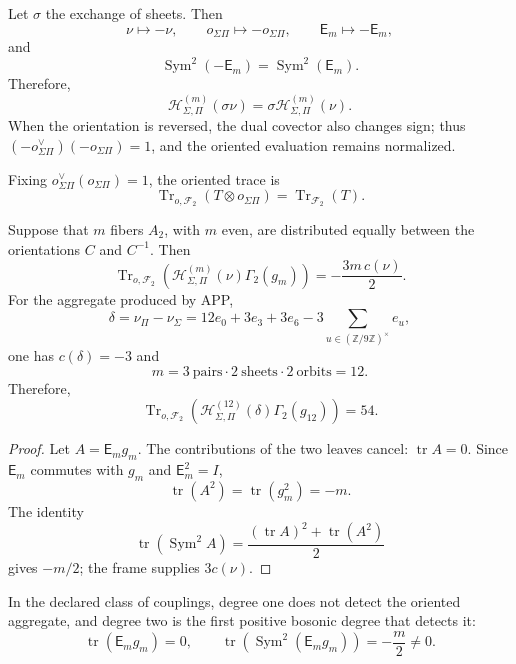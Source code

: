 Let \(\sigma\) the exchange of sheets. Then
\[
\nu\longmapsto-\nu,\qquad
o_{\Sigma\Pi}\longmapsto-o_{\Sigma\Pi},\qquad
\mathsf E_m\longmapsto-\mathsf E_m,
\]
and
\[
\operatorname{Sym}^2(-\mathsf E_m)
=\operatorname{Sym}^2(\mathsf E_m).
\]
Therefore,
\[
\mathcal H_{\Sigma,\Pi}^{(m)}(\sigma\nu)
=\sigma\mathcal H_{\Sigma,\Pi}^{(m)}(\nu).
\]
When the orientation is reversed, the dual covector also changes sign; thus
\((-o_{\Sigma\Pi}^{\vee})(-o_{\Sigma\Pi})=1\), and the oriented evaluation
remains normalized.

Fixing
\(o_{\Sigma\Pi}^{\vee}(o_{\Sigma\Pi})=1\), the oriented trace is
\[
\operatorname{Tr}_{o,\mathcal F_2}
(T\otimes o_{\Sigma\Pi})
=\operatorname{Tr}_{\mathcal F_2}(T).
\]

\begin{theorem}
\label{p12-83-c20-s7:thm:indice-orientado-app-fock}
Suppose that \(m\) fibers \(A_2\), with \(m\) even, are distributed equally
between the orientations \(C\) and \(C^{-1}\). Then
\[
\boxed{
\operatorname{Tr}_{o,\mathcal F_2}
\left(
\mathcal H_{\Sigma,\Pi}^{(m)}(\nu)\Gamma_2(g_m)
\right)
=-\frac{3m\,c(\nu)}2.}
\]
For the aggregate produced by APP,
\[
\delta=\nu_\Pi-\nu_\Sigma
=12e_0+3e_3+3e_6
-3\sum_{u\in(\mathbb Z/9\mathbb Z)^\times}e_u,
\]
one has \(c(\delta)=-3\) and
\[
m=3\ \text{pairs}\cdot2\ \text{sheets}\cdot2\ \text{orbits}=12.
\]
Therefore,
\[
\boxed{
\operatorname{Tr}_{o,\mathcal F_2}
\left(
\mathcal H_{\Sigma,\Pi}^{(12)}(\delta)\Gamma_2(g_{12})
\right)=54.}
\]
\end{theorem}

\begin{proof}
Let \(A=\mathsf E_mg_m\). The contributions of the two leaves cancel:
\(\operatorname{tr}A=0\). Since \(\mathsf E_m\) commutes with \(g_m\) and
\(\mathsf E_m^2=I\),
\[
\operatorname{tr}(A^2)=\operatorname{tr}(g_m^2)=-m.
\]
The identity
\[
\operatorname{tr}(\operatorname{Sym}^2A)
=\frac{(\operatorname{tr}A)^2+\operatorname{tr}(A^2)}2
\]
gives \(-m/2\); the frame supplies \(3c(\nu)\).
\end{proof}

\begin{corollary}
\label{p12-83-c20-s7:cor:minimalidad-grado-dos-app-fock-u030}
In the declared class of couplings, degree one does not detect the oriented
aggregate, and degree two is the first positive bosonic degree that
detects it:
\[
 \operatorname{tr}(\mathsf E_mg_m)=0,
 \qquad
 \operatorname{tr}\!\left(
 \operatorname{Sym}^2(\mathsf E_mg_m)
 \right)=-\frac m2\neq0.
\]
\end{corollary}

